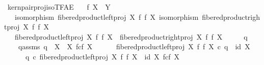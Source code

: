 \begin{isabellebody}
\isamarkupfalse%
%
\endisatagproof
{\isafoldproof}%
%
\isadelimproof
\isanewline
%
\endisadelimproof
\isanewline
{}\isamarkupfalse%
\ kern{\isacharunderscore}{\kern0pt}pair{\isacharunderscore}{\kern0pt}proj{\isacharunderscore}{\kern0pt}iso{\isacharunderscore}{\kern0pt}TFAE{}{\isacharcolon}{\kern0pt}\isanewline
\ \ \ {\isachardoublequoteopen}f{\isacharcolon}{\kern0pt}\ X\ {\isasymrightarrow}\ Y{\isachardoublequoteclose}\isanewline
\ \ \ {\isachardoublequoteopen}isomorphism\ {\isacharparenleft}{\kern0pt}fibered{\isacharunderscore}{\kern0pt}product{\isacharunderscore}{\kern0pt}left{\isacharunderscore}{\kern0pt}proj\ X\ f\ f\ X{\isacharparenright}{\kern0pt}{\isachardoublequoteclose}\ {\isachardoublequoteopen}isomorphism\ {\isacharparenleft}{\kern0pt}fibered{\isacharunderscore}{\kern0pt}product{\isacharunderscore}{\kern0pt}right{\isacharunderscore}{\kern0pt}proj\ X\ f\ f\ X{\isacharparenright}{\kern0pt}{\isachardoublequoteclose}\isanewline
\ \ \ {\isachardoublequoteopen}fibered{\isacharunderscore}{\kern0pt}product{\isacharunderscore}{\kern0pt}left{\isacharunderscore}{\kern0pt}proj\ X\ f\ f\ X\ {\isacharequal}{\kern0pt}\ fibered{\isacharunderscore}{\kern0pt}product{\isacharunderscore}{\kern0pt}right{\isacharunderscore}{\kern0pt}proj\ X\ f\ f\ X{\isachardoublequoteclose}\isanewline
%
\isadelimproof
%
\endisadelimproof
%
\isatagproof
{}\isamarkupfalse%
\ {\isacharminus}{\kern0pt}\isanewline
\ \ \isamarkupfalse%
\ q{}\ \ \isanewline
\ \ \ \ q{}{\isacharunderscore}{\kern0pt}assms{\isacharcolon}{\kern0pt}\ {\isachardoublequoteopen}q{}\ {\isacharcolon}{\kern0pt}\ X\ {\isasymrightarrow}\ X\ \isactrlbsub f\isactrlesub {\isasymtimes}\isactrlsub c\isactrlbsub f\isactrlesub \ X{\isachardoublequoteclose}\isanewline
\ \ \ \ \ \ {\isachardoublequoteopen}fibered{\isacharunderscore}{\kern0pt}product{\isacharunderscore}{\kern0pt}left{\isacharunderscore}{\kern0pt}proj\ X\ f\ f\ X\ {\isasymcirc}\isactrlsub c\ q{}\ {\isacharequal}{\kern0pt}\ id\ X{\isachardoublequoteclose}\isanewline
\ \ \ \ \ \ {\isachardoublequoteopen}q{}\ {\isasymcirc}\isactrlsub c\ fibered{\isacharunderscore}{\kern0pt}product{\isacharunderscore}{\kern0pt}left{\isacharunderscore}{\kern0pt}proj\ X\ f\ f\ X\ {\isacharequal}{\kern0pt}\ id\ {\isacharparenleft}{\kern0pt}X\ \isactrlbsub f\isactrlesub {\isasymtimes}\isactrlsub c\isactrlbsub f\isactrlesub \ X{\isacharparenright}{\kern0pt}{\isachardoublequoteclose}\isanewline

\end{isabellebody}
